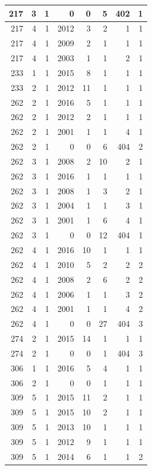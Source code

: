 \documentclass[11pt,]{book}
\begin{document}
\begin{table}
\begin{tabular}[t]{r|r|r|r|r|r|r|r}
\hline
217 & 3 & 1 & 0 & 0 & 5 & 402 & 1\\
\hline
217 & 4 & 1 & 2012 & 3 & 2 & 1 & 1\\
\hline
217 & 4 & 1 & 2009 & 2 & 1 & 1 & 1\\
\hline
217 & 4 & 1 & 2003 & 1 & 1 & 2 & 1\\
\hline
233 & 1 & 1 & 2015 & 8 & 1 & 1 & 1\\
\hline
233 & 2 & 1 & 2012 & 11 & 1 & 1 & 1\\
\hline
262 & 2 & 1 & 2016 & 5 & 1 & 1 & 1\\
\hline
262 & 2 & 1 & 2012 & 2 & 1 & 1 & 1\\
\hline
262 & 2 & 1 & 2001 & 1 & 1 & 4 & 1\\
\hline
262 & 2 & 1 & 0 & 0 & 6 & 404 & 2\\
\hline
262 & 3 & 1 & 2008 & 2 & 10 & 2 & 1\\
\hline
262 & 3 & 1 & 2016 & 1 & 1 & 1 & 1\\
\hline
262 & 3 & 1 & 2008 & 1 & 3 & 2 & 1\\
\hline
262 & 3 & 1 & 2004 & 1 & 1 & 3 & 1\\
\hline
262 & 3 & 1 & 2001 & 1 & 6 & 4 & 1\\
\hline
262 & 3 & 1 & 0 & 0 & 12 & 404 & 1\\
\hline
262 & 4 & 1 & 2016 & 10 & 1 & 1 & 1\\
\hline
262 & 4 & 1 & 2010 & 5 & 2 & 2 & 2\\
\hline
262 & 4 & 1 & 2008 & 2 & 6 & 2 & 2\\
\hline
262 & 4 & 1 & 2006 & 1 & 1 & 3 & 2\\
\hline
262 & 4 & 1 & 2001 & 1 & 1 & 4 & 2\\
\hline
262 & 4 & 1 & 0 & 0 & 27 & 404 & 3\\
\hline
274 & 2 & 1 & 2015 & 14 & 1 & 1 & 1\\
\hline
274 & 2 & 1 & 0 & 0 & 1 & 404 & 3\\
\hline
306 & 1 & 1 & 2016 & 5 & 4 & 1 & 1\\
\hline
306 & 2 & 1 & 0 & 0 & 1 & 1 & 1\\
\hline
309 & 5 & 1 & 2015 & 11 & 2 & 1 & 1\\
\hline
309 & 5 & 1 & 2015 & 10 & 2 & 1 & 1\\
\hline
309 & 5 & 1 & 2013 & 10 & 1 & 1 & 1\\
\hline
309 & 5 & 1 & 2012 & 9 & 1 & 1 & 1\\
\hline
309 & 5 & 1 & 2014 & 6 & 1 & 1 & 2\\

\end{tabular}
\end{table}
\end{document}
